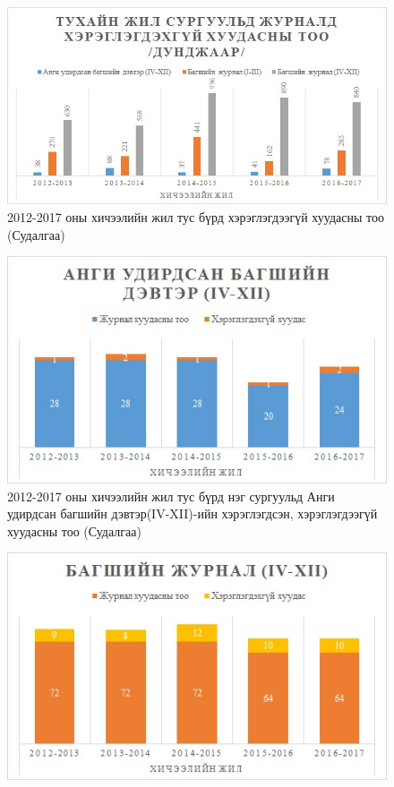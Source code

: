\begin{figure}[htbp]
	\centering
	\includegraphics[scale=0.8]{Chart/Chart3}
	\caption[Хэрэглэгчийн судалгаа]{2012-2017 оны хичээлийн жил тус бүрд хэрэглэгдээгүй хуудасны тоо (Судалгаа)}
	\label{fig:Chart2}
\end{figure}\begin{figure}[htbp]
\centering
\includegraphics[scale=1]{Chart/Chart4}
\caption[Хэрэглэгчийн судалгаа]{2012-2017 оны хичээлийн жил тус бүрд нэг сургуульд Анги удирдсан багшийн дэвтэр(IV-XII)-ийн хэрэглэгдсэн, хэрэглэгдээгүй хуудасны тоо (Судалгаа)}
\label{fig:Chart2}
\end{figure}\begin{figure}[htbp]
\centering
\includegraphics[scale=1]{Chart/Chart5}

\end{figure}
